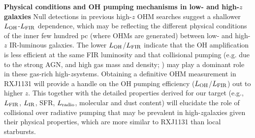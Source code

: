 \documentclass[letterpaper,11pt]{article}
\newcommand{\LIR}{\mbox{$L_{\rm IR}$}\xspace}
\newcommand{\LFIR}{\mbox{$L_{\rm FIR}$}\xspace}
\newcommand{\LOH}{$L_{\rm OH}$\xspace}
\newcommand{\ssim}{\,$\sim$\,}
\newcommand{\highz}{high-$z$\space}
\begin{document}
%
{\bf Physical conditions and OH pumping mechanisms in low- and high-$z$ galaxies}
Null detections in previous high-$z$ OHM searches suggest a shallower \LOH-\LFIR dependence, which may be
reflecting the different physical conditions of the inner few hundred pc (where OHMs are generated) 
between low- and high-$z$ IR-luminous galaxies.
The lower \LOH/\LFIR indicate that the OH amplification is less efficient at the same FIR luminosity 
and that collisional pumping (e.g. due to the strong AGN, and high gas mass and density; \citealt{Field94a}) %
%
may play a dominant role in these gas-rich \highz systems.
Obtaining a definitive OHM measurement in RXJ1131 will provide a handle on the OH pumping efficiency (\LOH/\LFIR) out to higher $z$.
This together with the detailed properties derived for our target (e.g., \LFIR, \LIR, SFR, $L_{\rm radio}$, molecular and dust content)
will elucidate the role of collisional over radiative pumping
that may be prevalent in \highz galaxies given their physical properties, which are more similar to RXJ1131 than 
local starbursts. %
\end{document}
